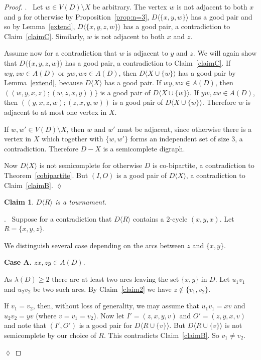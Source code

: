 \documentclass{article}
\newtheorem{claim}{Claim}[theorem]
\theoremstyle{definition}
\newcommand{\induce}[2]{#1\langle #2 \rangle}
\newcommand{\2}{\vspace{0.2cm}}
\newenvironment{subproof}{\par\noindent {\it Proof}.\ }{\hfill$\lozenge$\par\vspace{11pt}}
\begin{document}
\begin{proof}
\begin{subproof}
Let $w \in V(D) \setminus X$ be arbitrary. The vertex $w$ is not
adjacent to both $x$ and $y$ for otherwise by
Proposition~\ref{prop:n=3}, $\induce{D}{\{x,y,w\}}$ has a good pair
and so by Lemma~\ref{extend}, $\induce{D}{\{x,y,z,w\}}$ has a good
pair, a contradiction to Claim~\ref{claimC}.  Similarly, $w$ is not
adjacent to both $x$ and $z$.

Assume now for a contradiction that $w$ is adjacent to $y$ and $z$.
We will again show that $\induce{D}{\{x,y,z,w\}}$ has a good pair, a
contradiction to Claim~\ref{claimC}.  If $wy,zw \in A(D)$ or $yw,wz
\in A(D)$, then $\induce{D}{X \cup \{w\}}$ has a good pair by
Lemma~\ref{extend}, because $\induce{D}{X}$ has a good pair.  If $wy,wz
\in A(D)$, then $((w, y, x,z) ; (w,z,x,y))\}$ is a good pair of
$\induce{D}{X \cup \{w\}}$.  If $yw,zw \in A(D)$, then $((y,x,z,w) ;
(z,x,y,w))$ is a good pair of $\induce{D}{X \cup \{w\}}$.  Therefore
$w$ is adjacent to at most one vertex in $X$.

If $w,w' \in V(D) \setminus X$, then $w$ and $w'$ must be adjacent,
since otherwise there is a vertex in $X$ which together with
$\{w,w'\}$ forms an independent set of size 3, a contradiction.
Therefore $D - X$ is a semicomplete digraph.

Now $\induce{D}{X}$ is not semicomplete for otherwise $D$ is
co-bipartite, a contradiction to Theorem~\ref{cobipartite}.  But
$(I,O)$ is a good pair of $\induce{D}{X}$, a contradiction to
Claim~\ref{claimB}.
\end{subproof}

\begin{claim}\label{claim3}
$\induce{D}{R}$ is a tournament.
\end{claim}
\begin{subproof} 
Suppose for a contradiction that $\induce{D}{R}$ contains a $2$-cycle
$(x,y,x)$.  Let $R=\{x,y,z\}$.

We distinguish several case depending on the arcs between $z$ and
$\{x,y\}$.

\2

{\bf Case A.}  $zx,zy \in A(D)$.

\2

As $\lambda(D) \geq 2$ there are at least two arcs leaving the set
$\{x,y\}$ in $D$.  Let $u_1v_1$ and $u_2v_2$ be two such arcs. By
Claim~\ref{claim2} we have $z \not\in \{v_1,v_2\}$.

If $v_1=v_2$, then, without loss of generality, we may assume that
$u_1v_1 = xv$ and $u_2v_2 = yv$ (where $v=v_1=v_2$).  Now let
$I'=(z,x,y,v)$ and $O'=(z,y,x,v)$ and note that $(I',O')$ is a good
pair for $\induce{D}{R \cup \{v\}}$. But $\induce{D}{R \cup \{v\}}$ is
not semicomplete by our choice of $R$. This contradicts
Claim~\ref{claimB}.  So $v_1 \neq v_2$.


\end{subproof}
\end{proof}
\end{document}
